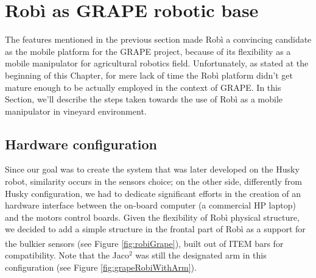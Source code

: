 \section{Robì as GRAPE robotic base}
The features mentioned in the previous section made Robì a convincing candidate as the mobile platform for the \ac{GRAPE} project, because of its flexibility as a mobile manipulator for agricultural robotics field. Unfortunately, as stated at the beginning of this Chapter, for mere lack of time the Robì platform didn't get mature enough to be actually employed in the context of \ac{GRAPE}. In this Section, we'll describe the steps taken towards the use of Robì as a mobile manipulator in vineyard environment.

\subsection{Hardware configuration}
Since our goal was to create the system that was later developed on the Husky robot, similarity occurs in the sensors choice; on the other side, differently from Husky configuration, we had to dedicate significant efforts in the creation of an hardware interface between the on-board computer (a commercial HP laptop) and the motors control boards. Given the flexibility of Robì physical structure, we decided to add a simple structure in the frontal part of Robì as a support for the bulkier sensors (see Figure \ref{fig:robiGrape}), built out of ITEM\textsuperscript{\textregistered} bars for compatibility. Note that the Jaco$^2$ was still the designated arm in this configuration (see Figure \ref{fig:grapeRobiWithArm}).
